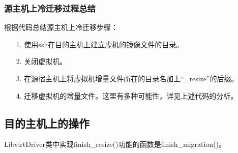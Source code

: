 \documentclass[a4paper,left=1.5cm,right=1.5cm,11pt]{article}
\begin{document}
\subsubsection{源主机上冷迁移过程总结}
	根据代码总结源主机上冷迁移步骤：
	\begin{itemize}
		\item[1.] 使用ssh在目的主机上建立虚机的镜像文件的目录。
		\item[2.] 关闭虚拟机。
		\item[3.] 在源宿主机上将虚拟机增量文件所在的目录名加上“\_resize”的后缀。
		\item[4.] 迁移虚拟机的增量文件。这里有多种可能性，详见上述代码的分析。
	\end{itemize}

\clearpage

\subsection{目的主机上的操作}
	LibvirtDriver类中实现finish\_resize()功能的函数是finish\_migration()。\par
\end{document}
